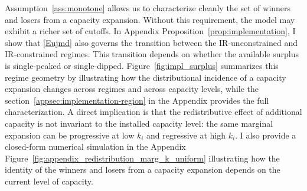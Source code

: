 \documentclass{class}
\begin{document}
Assumption~\ref{ass:monotone} allows us to characterize cleanly the set of winners and losers from a capacity expansion. Without this requirement, the model may exhibit a richer set of cutoffs. In Appendix Proposition~\ref{prop:implementation}, I show that \ref{Eujmd} also governs the transition between the IR-unconstrained and IR-constrained regimes. This transition depends on whether the available surplus is single-peaked or single-dipped. Figure~\ref{fig:impl_surplus} summarizes this regime geometry by illustrating how the distributional incidence of a capacity expansion changes across regimes and across capacity levels, while the section~\ref{appsec:implementation-region} in the Appendix provides the full characterization. A direct implication is that the redistributive effect of additional capacity is not invariant to the installed capacity level: the same marginal expansion can be progressive at low \(k_i\) and regressive at high \(k_i\). I also provide a closed-form numerical simulation in the Appendix Figure~\ref{fig:appendix_redistribution_marg_k_uniform} illustrating how the identity of the winners and losers from a capacity expansion depends on the current level of capacity.
\end{document}
